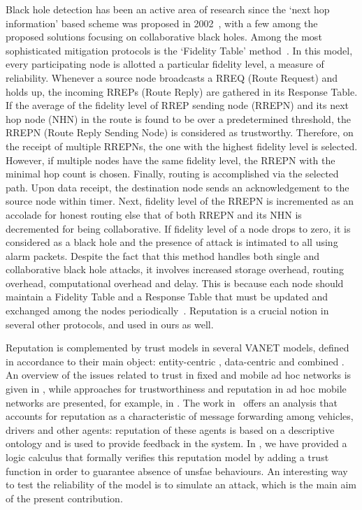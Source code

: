 \documentclass[compsoc, conference, letterpaper, 10pt, times]{IEEEtran}
\begin{document}
Black hole detection has been an active area of research since the `next hop information' based scheme was proposed in 2002~\cite{survey8}, with a
few among the proposed solutions focusing on collaborative black holes. Among the most sophisticated mitigation protocols is the `Fidelity Table' method~\cite{survey6}. In this model, every participating node is allotted a particular fidelity level, a measure of reliability. Whenever a source node broadcasts a RREQ (Route Request) and holds up, the incoming RREPs (Route Reply) are gathered in its Response Table. If the average of the fidelity level of RREP sending node (RREPN) and its next hop node (NHN) in the route is found to be over a predetermined threshold, the RREPN (Route Reply Sending Node) is considered as trustworthy. Therefore, on the receipt of multiple RREPNs, the one with the highest fidelity level is selected. However, if multiple nodes have the same fidelity level, the RREPN with the minimal hop count is
chosen. Finally, routing is accomplished via the selected path. Upon data receipt, the destination node sends an acknowledgement to the source node within timer. Next, fidelity level of the RREPN
is incremented as an accolade for honest routing else that of both RREPN and its NHN is decremented for being collaborative. If fidelity level of a node drops to zero, it is considered as a black hole and the presence of attack is intimated to all using alarm packets. Despite the fact that this method handles both single and collaborative black hole attacks, it involves increased storage overhead, routing overhead, computational overhead and delay. This is because each node should maintain a Fidelity Table and a Response Table that must be updated and exchanged among the
nodes periodically~\cite{survey7}. Reputation is a crucial notion in several other protocols, and used in ours as well.

Reputation is complemented by trust models in several VANET models, defined in accordance to their main object: entity-centric \cite{Minhas:2011:MAM:2334807.2334820, GomezMarmol:2012:TTR:2160992.2161100}, data-centric \cite{DBLP:conf/infocom/RayaPGH08, Lo:2009:RST:1598776.1945486} and combined \cite{Wei2012}. An overview of the issues related to trust in fixed and mobile ad hoc networks is given in \cite{DBLP:conf/vtc/WexBHLD08}, while approaches for trustworthiness and reputation in ad hoc mobile networks are presented, for example, in \cite{DBLP:conf/um/FinnsonZTMC12, DBLP:journals/ijaisc/ChaurasiaTV15}. The work in~\cite{glenford} offers an analysis that accounts for reputation as a characteristic of message forwarding among vehicles, drivers and other agents: reputation of these agents is based on a descriptive ontology and is used to provide feedback in the system. In \cite{DBLP:conf/eurosp/PrimieroRCN17}, we have provided a logic calculus that formally verifies this reputation model by adding a trust function in order to guarantee absence of unsfae behaviours. An interesting way to test the reliability of the model is to simulate an attack, which is the main aim of the present contribution.
\end{document}
